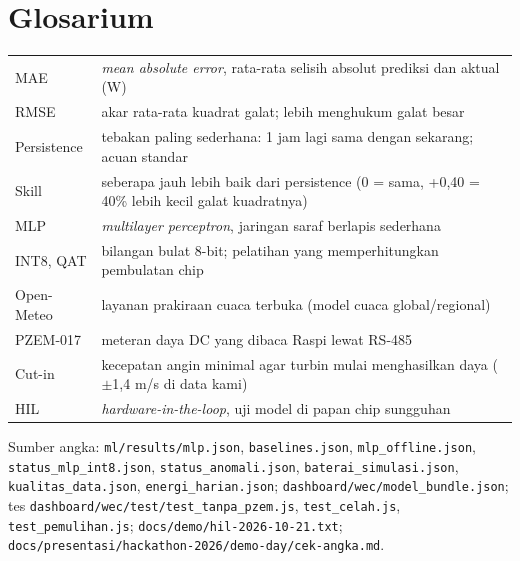 \documentclass[10.5pt,a4paper]{article}
\newcommand{\cmd}[1]{\texttt{#1}}
\begin{document}
\section{Glosarium}
\begin{tabularx}{\linewidth}{@{}l X@{}}
\toprule
MAE & \emph{mean absolute error}, rata-rata selisih absolut prediksi dan aktual (W) \\
RMSE & akar rata-rata kuadrat galat; lebih menghukum galat besar \\
Persistence & tebakan paling sederhana: 1 jam lagi sama dengan sekarang; acuan standar \\
Skill & seberapa jauh lebih baik dari persistence (0 = sama, +0,40 = 40\% lebih kecil galat kuadratnya) \\
MLP & \emph{multilayer perceptron}, jaringan saraf berlapis sederhana \\
INT8, QAT & bilangan bulat 8-bit; pelatihan yang memperhitungkan pembulatan chip \\
Open-Meteo & layanan prakiraan cuaca terbuka (model cuaca global/regional) \\
PZEM-017 & meteran daya DC yang dibaca Raspi lewat RS-485 \\
Cut-in & kecepatan angin minimal agar turbin mulai menghasilkan daya ($\pm$1,4 m/s di data kami) \\
HIL & \emph{hardware-in-the-loop}, uji model di papan chip sungguhan \\
\bottomrule
\end{tabularx}

\vspace{4pt}
{\footnotesize Sumber angka: \cmd{ml/results/mlp.json}, \cmd{baselines.json}, \cmd{mlp\_offline.json}, \cmd{status\_mlp\_int8.json},
\cmd{status\_anomali.json}, \cmd{baterai\_simulasi.json}, \cmd{kualitas\_data.json}, \cmd{energi\_harian.json}; \cmd{dashboard/wec/model\_bundle.json};
tes \cmd{dashboard/wec/test/test\_tanpa\_pzem.js}, \cmd{test\_celah.js}, \cmd{test\_pemulihan.js}; \cmd{docs/demo/hil-2026-10-21.txt};
\cmd{docs/presentasi/hackathon-2026/demo-day/cek-angka.md}.}
\end{document}
